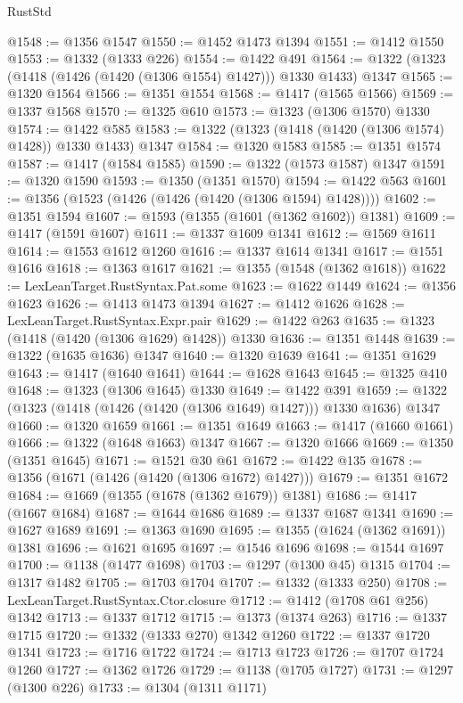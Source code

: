 \begin{lexlean}{RustStd}
\begin{coremodule}
@1548 := @1356 @1547
@1550 := @1452 @1473 @1394
@1551 := @1412 @1550
@1553 := @1332 (@1333 @226)
@1554 := @1422 @491
@1564 := @1322 (@1323 (@1418 (@1426 (@1420 (@1306 @1554) @1427))) @1330 @1433) @1347
@1565 := @1320 @1564
@1566 := @1351 @1554
@1568 := @1417 (@1565 @1566)
@1569 := @1337 @1568
@1570 := @1325 @610
@1573 := @1323 (@1306 @1570) @1330
@1574 := @1422 @585
@1583 := @1322 (@1323 (@1418 (@1420 (@1306 @1574) @1428)) @1330 @1433) @1347
@1584 := @1320 @1583
@1585 := @1351 @1574
@1587 := @1417 (@1584 @1585)
@1590 := @1322 (@1573 @1587) @1347
@1591 := @1320 @1590
@1593 := @1350 (@1351 @1570)
@1594 := @1422 @563
@1601 := @1356 (@1523 (@1426 (@1426 (@1420 (@1306 @1594) @1428))))
@1602 := @1351 @1594
@1607 := @1593 (@1355 (@1601 (@1362 @1602)) @1381)
@1609 := @1417 (@1591 @1607)
@1611 := @1337 @1609 @1341
@1612 := @1569 @1611
@1614 := @1553 @1612 @1260
@1616 := @1337 @1614 @1341
@1617 := @1551 @1616
@1618 := @1363 @1617
@1621 := @1355 (@1548 (@1362 @1618))
@1622 := LexLeanTarget.RustSyntax.Pat.some
@1623 := @1622 @1449
@1624 := @1356 @1623
@1626 := @1413 @1473 @1394
@1627 := @1412 @1626
@1628 := LexLeanTarget.RustSyntax.Expr.pair
@1629 := @1422 @263
@1635 := @1323 (@1418 (@1420 (@1306 @1629) @1428)) @1330
@1636 := @1351 @1448
@1639 := @1322 (@1635 @1636) @1347
@1640 := @1320 @1639
@1641 := @1351 @1629
@1643 := @1417 (@1640 @1641)
@1644 := @1628 @1643
@1645 := @1325 @410
@1648 := @1323 (@1306 @1645) @1330
@1649 := @1422 @391
@1659 := @1322 (@1323 (@1418 (@1426 (@1420 (@1306 @1649) @1427))) @1330 @1636) @1347
@1660 := @1320 @1659
@1661 := @1351 @1649
@1663 := @1417 (@1660 @1661)
@1666 := @1322 (@1648 @1663) @1347
@1667 := @1320 @1666
@1669 := @1350 (@1351 @1645)
@1671 := @1521 @30 @61
@1672 := @1422 @135
@1678 := @1356 (@1671 (@1426 (@1420 (@1306 @1672) @1427)))
@1679 := @1351 @1672
@1684 := @1669 (@1355 (@1678 (@1362 @1679)) @1381)
@1686 := @1417 (@1667 @1684)
@1687 := @1644 @1686
@1689 := @1337 @1687 @1341
@1690 := @1627 @1689
@1691 := @1363 @1690
@1695 := @1355 (@1624 (@1362 @1691)) @1381
@1696 := @1621 @1695
@1697 := @1546 @1696
@1698 := @1544 @1697
@1700 := @1138 (@1477 @1698)
@1703 := @1297 (@1300 @45) @1315
@1704 := @1317 @1482
@1705 := @1703 @1704
@1707 := @1332 (@1333 @250)
@1708 := LexLeanTarget.RustSyntax.Ctor.closure
@1712 := @1412 (@1708 @61 @256) @1342
@1713 := @1337 @1712
@1715 := @1373 (@1374 @263)
@1716 := @1337 @1715
@1720 := @1332 (@1333 @270) @1342 @1260
@1722 := @1337 @1720 @1341
@1723 := @1716 @1722
@1724 := @1713 @1723
@1726 := @1707 @1724 @1260
@1727 := @1362 @1726
@1729 := @1138 (@1705 @1727)
@1731 := @1297 (@1300 @226)
@1733 := @1304 (@1311 @1171)

\end{coremodule}
\end{lexlean}
